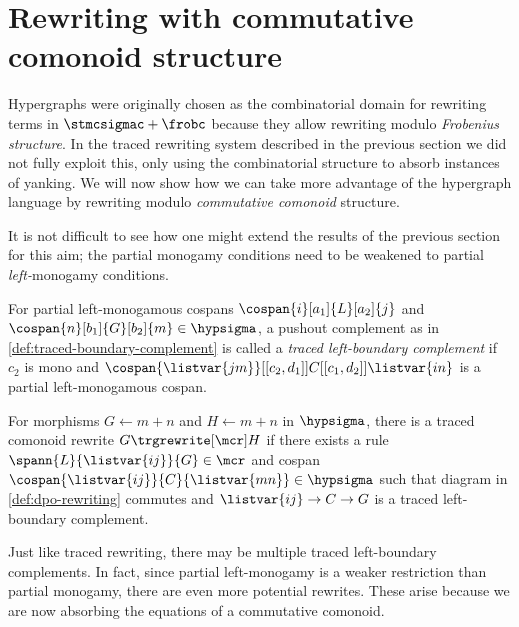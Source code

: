 \section{Rewriting with commutative comonoid structure}

Hypergraphs were originally chosen as the combinatorial domain for rewriting
terms in \(\stmcsigmac + \frobc\) because they allow rewriting modulo
\emph{Frobenius structure}.
In the traced rewriting system described in the previous section we did not
fully exploit this, only using the combinatorial structure to absorb instances
of yanking.
We will now show how we can take more advantage of the hypergraph language by
rewriting  modulo \emph{commutative comonoid} structure.

It is not difficult to see how one might extend the results of the previous
section for this aim; the partial monogamy conditions need to be weakened to
partial \emph{left-}monogamy conditions.

\begin{definition}
    \label{def:traced-left-boundary-complement}
    For partial left-monogamous cospans \(
    \cospan{i}[a_1]{L}[a_2]{j}
    \) and \(
    \cospan{n}[b_1]{G}[b_2]{m} \in \hypsigma
    \), a pushout complement as in \cref{def:traced-boundary-complement}
    is called a \emph{traced left-boundary complement} if \(c_2\)
    is mono and \(
    \cospan{\listvar{jm}}[[c_2,d_1]]{C}[[c_1,d_2]]{{\listvar{in}}}
    \) is a partial left-monogamous cospan.
\end{definition}

\begin{definition}
    For morphisms \(G \leftarrow m+n\) and \(H \leftarrow m+n\) in
    \(\hypsigma\), there is a traced comonoid rewrite \(G \trgrewrite[\mcr] H\)
    if there exists a rule \(
    \spann{L}{\listvar{ij}}{G} \in \mcr
    \) and cospan \(
    \cospan{\listvar{ij}}{C}{\listvar{mn}} \in \hypsigma
    \) such that diagram in \cref{def:dpo-rewriting} commutes and
    \(\listvar{ij} \to C \to G\) is a
    traced left-boundary complement.
\end{definition}

Just like traced rewriting, there may be multiple traced left-boundary
complements.
In fact, since partial left-monogamy is a weaker restriction than partial
monogamy, there are even more potential rewrites.
These arise because we are now absorbing the equations of a commutative
comonoid.


